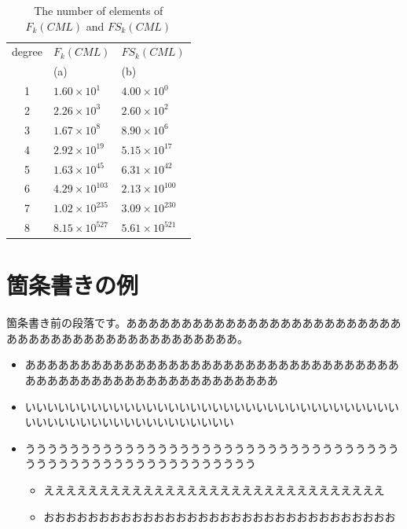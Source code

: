 \documentclass[a4paper, 12pt]{ltjreport}
\begin{document}
\begin{table}[tb]
 \centering
  \caption{The number of elements of $F_{k}(CML)$ and $FS_{k}(CML)$}
  \label{tab:num_of_schemata_satisfied_srp}
  \begin{tabular}{c l l}
    \hline
    degree & $F_{k}(CML)$ &$FS_{k}(CML)$ \\
    & (a)&  (b)\\ 
    \hline
    \hline
    1 &  $1.60 \times 10^{1}$ & $4.00 \times 10^{0}$\\
    2 & $2.26 \times 10^{3}$ & $2.60 \times 10^{2}$  \\
    3 & $1.67 \times 10^{8}$ & $8.90 \times 10^{6}$\\
    4 & $2.92 \times 10^{19}$ & $5.15 \times 10^{17}$\\
    5 & $1.63 \times 10^{45}$ & $6.31 \times 10^{42}$\\
    6 & $4.29 \times 10^{103}$ & $2.13 \times 10^{100}$\\
    7 & $1.02 \times 10^{235}$ & $3.09 \times 10^{230}$\\
    8 & $8.15 \times 10^{527}$ & $5.61 \times 10^{521}$\\ 
    \hline
  \end{tabular}
\end{table}

\section{箇条書きの例}

箇条書き前の段落です。ああああああああああああああああああああああああああああああああああああああああああああああ。

\begin{itemize}
 \item あああああああああああああああああああああああああああああああああああああああああああああああああああああああああ
 \item いいいいいいいいいいいいいいいいいいいいいいいいいいいいいいいいいいいいいいいいいいいいいいいいいいいいい
 \item ううううううううううううううううううううううううううううううううううううううううううううううううううううううう
       \begin{itemize}
	\item えええええええええええええええええええええええええええええええ
	\item おおおおおおおおおおおおおおおおおおおおおおおおおおおおおおおお
       \end{itemize}
\end{itemize}
\end{document}
